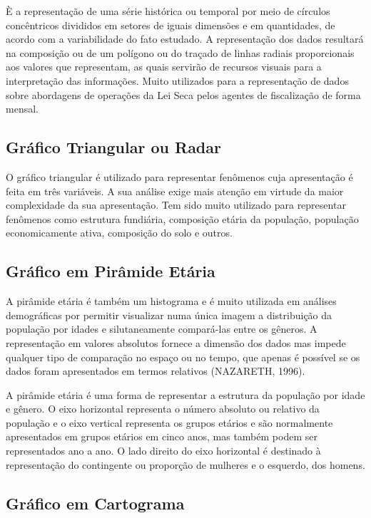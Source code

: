 È a representação de uma série histórica ou temporal por meio de
círculos concêntricos divididos em setores de iguais dimensões e
em quantidades, de acordo com a variabilidade do fato estudado. A
representação dos dados resultará na composição ou de um polígono
ou do traçado de linhas radiais proporcionais aos valores que
representam, as quais servirão de recursos visuais para a
interpretação das informações. Muito utilizados para a
representação de dados sobre abordagens de operações da Lei Seca
pelos agentes de fiscalização de forma mensal.


\subsection{Gráfico Triangular ou Radar}

O gráfico triangular é utilizado para representar fenômenos cuja
apresentação é feita em três variáveis. A sua análise exige mais
atenção em virtude da maior complexidade da sua apresentação. Tem
sido muito utilizado para representar fenômenos como estrutura
fundiária, composição etária da população, população
economicamente ativa, composição do solo e outros.



\subsection{Gráfico em Pirâmide Etária}

A pirâmide etária é também um histograma e é muito utilizada em  análises demográficas por permitir visualizar numa única imagem a distribuição da população por idades e silutaneamente compará-las entre os gêneros. A representação em valores absolutos fornece a dimensão dos dados mas impede qualquer tipo de comparação no espaço ou no tempo, que apenas é possível se os dados foram apresentados em termos relativos (NAZARETH, 1996). 
\vskip0.3cm

A pirâmide etária é uma forma de representar a estrutura da
população por idade e gênero. O eixo horizontal representa o
número absoluto ou relativo da população e o eixo vertical
representa os grupos etários e são normalmente apresentados em grupos etários em cinco anos, mas também podem ser representados ano a ano. O lado direito do eixo horizontal é destinado à representação do contingente ou proporção de mulheres e o esquerdo, dos homens.

\subsection{Gráfico em Cartograma}

